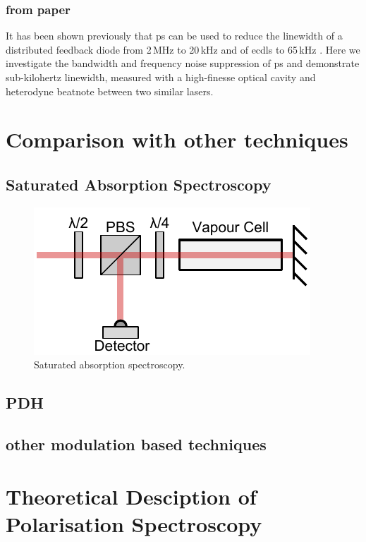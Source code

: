 \subsubsection{from paper}
It has been shown previously that \gls*{ps} can be used to reduce the linewidth of a distributed feedback diode from 2\,MHz to 20\,kHz \cite{torii_laser-phase_2012} and of \glspl*{ecdl} to 65\,kHz \cite{yoshikawa_frequency_2003}.
Here we investigate the bandwidth and frequency noise suppression of \gls*{ps} and demonstrate sub-kilohertz linewidth, measured with a high-finesse optical cavity and heterodyne beatnote between two similar lasers.

\section{Comparison with other techniques}
\subsection{Saturated Absorption Spectroscopy}

\begin{figure}
\includegraphics[width=\linewidth]{chapter1/Figs/SatAbs.pdf}
\caption{Saturated absorption spectroscopy.}
\end{figure}
\subsection{PDH}
\subsection{other modulation based techniques}
\section{Theoretical Desciption of Polarisation Spectroscopy}\label{section:pol_spec_theory}
